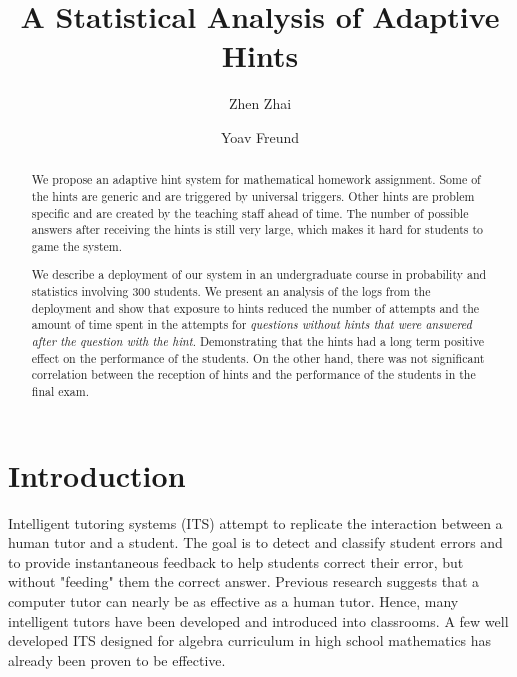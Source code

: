 \documentclass{llncs}
\title{A Statistical Analysis of Adaptive Hints}
\author{Zhen Zhai\inst{1} \and Yoav Freund\inst{2}}
\institute{UC San Diego \email{zzhai@eng.ucsd.edu} \and UC San Diego \email{yfreund@eng.ucsd.edu}}
\begin{document}
\maketitle


\begin{abstract}
We propose an adaptive hint system for mathematical homework assignment. Some of the hints are generic and are triggered by universal triggers. Other hints are problem specific and are created by the teaching staff ahead of time. The number of possible answers after receiving the hints is still very large, which makes it hard for students to game the system.

We describe a deployment of our system in an undergraduate course in probability and statistics involving 300 students. We present an analysis of the logs from the deployment and show that exposure to hints reduced the number of attempts and the amount of time spent in the attempts for {\em questions without hints that were answered after the question with the hint}. Demonstrating that the hints had a long term positive effect on the performance of the students. On the other hand, there was not significant correlation between the reception of hints and the performance of the students in the final exam.

\end{abstract}


\section{Introduction}
Intelligent tutoring systems (ITS)\cite{Anderson1995} attempt to replicate the interaction between a human tutor and a student.  The goal is to detect and classify student errors and to provide instantaneous feedback to help students correct their error, but without "feeding" them the correct answer. Previous research suggests that a computer tutor can nearly be as effective as a human tutor\cite{Vanlehn2011}. Hence, many intelligent tutors have been developed and introduced into classrooms. A few well developed ITS designed for algebra curriculum in high school mathematics has already been proven to be effective\cite{Koedinger1997,John2014}.
\end{document}
